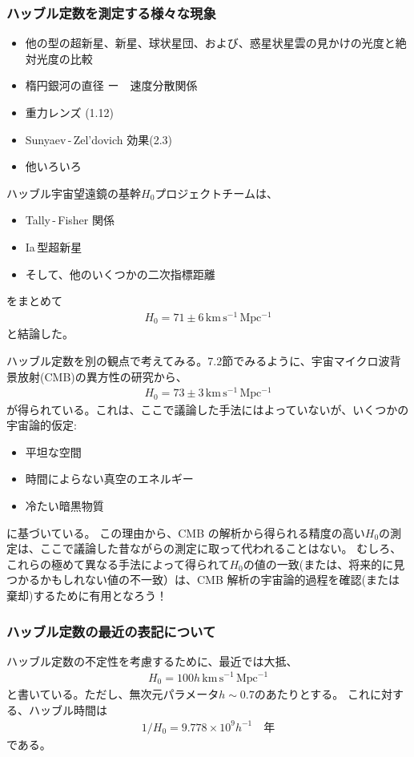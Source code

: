 \documentclass[11pt,a4paper,dvipdfmx]{jsarticle}
\theoremstyle{plain}
\theoremstyle{break}
\begin{document}
\subsubsection{ハッブル定数を測定する様々な現象}
\begin{itemize}
  \item 他の型の超新星、新星、球状星団、および、惑星状星雲の見かけの光度と絶対光度の比較
  \item 楕円銀河の直径 ー　速度分散関係
  \item 重力レンズ (1.12)
  \item Sunyaev\,-\,Zel'dovich 効果(2.3)
  \item 他いろいろ
\end{itemize}
ハッブル宇宙望遠鏡の基幹$H_0$プロジェクトチームは、
\begin{itemize}
  \item Tally\,-\,Fisher 関係
  \item Ia\,型超新星
  \item そして、他のいくつかの二次指標距離
\end{itemize}
をまとめて
\begin{align}
  H_0 = 71 \pm 6  \,\mathrm{km\,s^{-1}\,Mpc^{-1}}
\end{align}
と結論した。

ハッブル定数を別の観点で考えてみる。7.2節でみるように、宇宙マイクロ波背景放射(CMB)の異方性の研究から、
\begin{align}
  H_0 = 73 \pm 3  \,\mathrm{km\,s^{-1}\,Mpc^{-1}}
\end{align}
が得られている。これは、ここで議論した手法にはよっていないが、いくつかの宇宙論的仮定:
\begin{itemize}
  \item 平坦な空間
  \item 時間によらない真空のエネルギー
  \item 冷たい暗黒物質
\end{itemize}
に基づいている。
この理由から、CMB の解析から得られる精度の高い$H_0$の測定は、ここで議論した昔ながらの測定に取って代われることはない。
むしろ、これらの極めて異なる手法によって得られて$H_0$の値の一致(または、将来的に見つかるかもしれない値の不一致）は、CMB 解析の宇宙論的過程を確認(または棄却)するために有用となろう！

\subsubsection{ハッブル定数の最近の表記について}
ハッブル定数の不定性を考慮するために、最近では大抵、
\begin{align}
  H_0 =  100 h  \,\mathrm{km\,s^{-1}\,Mpc^{-1}}
\end{align}
と書いている。ただし、無次元パラメータ$h \sim 0.7$のあたりとする。
これに対する、ハッブル時間は
\begin{align}
  1/H_0 = 9.778 \times 10^9 h^{-1} \quad \text{年}
\end{align}
である。
\end{document}
